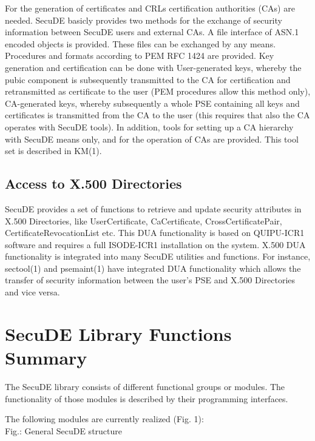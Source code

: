 For the generation of certificates and CRLs certification authorities 
(CAs) are needed.
SecuDE basicly provides two methods for the exchange of security
information between SecuDE users and external CAs.
\be
\m A file interface of ASN.1 encoded objects is provided. These
   files can be exchanged by any means.
\m Procedures and formats according to PEM RFC 1424 are provided.
\ee
Key generation and certification can be done with
\be
\m User-generated keys, whereby the pubic component is
   subsequently transmitted to the CA for certification and
   retransmitted as certificate to the user (PEM
   procedures allow this method only),
\m CA-generated keys, whereby subsequently a whole PSE
   containing all keys and certificates is transmitted from
   the CA to the user (this requires that also the CA operates
   with SecuDE tools).
\ee
In addition, tools for setting up a CA hierarchy with SecuDE means 
only, and for the operation of CAs are provided.
This tool set is described in KM(1).

\subsection{Access to X.500 Directories}

SecuDE provides a set of functions to retrieve and update security 
attributes in X.500
Directories, like UserCertificate, CaCertificate, CrossCertificatePair, 
CertificateRevocationList etc. This DUA functionality is based on
QUIPU-ICR1 software and requires a full ISODE-ICR1 installation on the system. 
X.500 DUA functionality is integrated into many SecuDE utilities
and functions. For instance, sectool(1) and psemaint(1) have integrated
DUA functionality
which allows the transfer of security information between the user's
PSE and X.500 Directories and vice versa.

\section{SecuDE Library Functions Summary}
\pagestyle{myheadings}

The SecuDE library consists of different functional groups or modules. The 
functionality of those modules is described by their programming 
interfaces.
 
The following modules are currently realized (Fig. 1):
\\ [0.4cm]


{\footnotesize Fig.:
General SecuDE structure}

